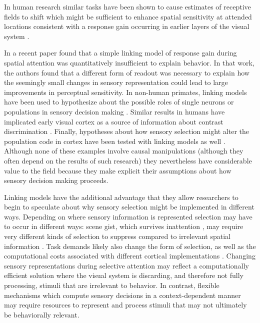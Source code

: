 In human research similar tasks have been shown to cause estimates of receptive fields to shift \citep{Klein2014-oe} which might be sufficient to enhance spatial sensitivity at attended locations \citep{Klein2016-ox,Vo2017-oi} consistent with a response gain occurring in earlier layers of the visual system \citep{Baruch2014-gy,Miconi2016-ip}.
 
In a recent paper \citet{Pestilli2011-gi} found that a simple linking model of response gain during spatial attention was quantitatively insufficient to explain behavior. In that work, the authors found that a different form of readout was necessary to explain how the seemingly small changes in sensory representation could lead to large improvements in perceptual sensitivity. In non-human primates, linking models have been used to hypothesize about the possible roles of single neurons or populations in sensory decision making \citep{Newsome1989-fr}. Similar results in humans have implicated early visual cortex as a source of information about contrast discrimination \citep{Boynton1999-jd}. Finally, hypotheses about how sensory selection might alter the population code in cortex have been tested with linking models as well \citep{Cohen2011-pa}. Although none of these examples involve causal manipulations (although they often depend on the results of such research) they nevertheless have considerable value to the field because they make explicit their assumptions about how sensory decision making proceeds.

Linking models have the additional advantage that they allow researchers to begin to speculate about why sensory selection might be implemented in different ways. Depending on where sensory information is represented selection may have to occur in different ways: scene gist, which survives inattention \citep{Li2002-ji,Peelen2009-us}, may require very different kinds of selection to suppress compared to irrelevant spatial information \citep{Pestilli2011-gi}. Task demands likely also change the form of selection, as well as the computational costs associated with different cortical implementations \citep{Gardner2019-ky}. Changing sensory representations during selective attention may reflect a computationally efficient solution where the visual system is discarding, and therefore not fully processing, stimuli that are irrelevant to behavior. In contrast, flexible mechanisms which compute sensory decisions in a context-dependent manner \citep{Mante2013-tn} may require resources to represent and process stimuli that may not ultimately be behaviorally relevant. 